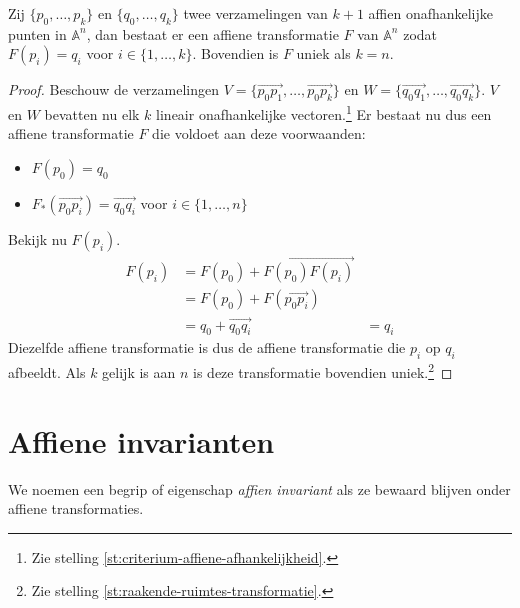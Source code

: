 \documentclass[main.tex]{subfiles}
\begin{document}
\begin{gev}
  Zij $\{p_{0},\dotsc,p_{k}\}$ en $\{q_{0},\dotsc,q_{k}\}$ twee verzamelingen van $k+1$ affien onafhankelijke punten in $\mathbb{A}^{n}$, dan bestaat er een affiene transformatie $F$ van $\mathbb{A}^{n}$ zodat $F(p_{i}) = q_{i}$ voor $i \in \{ 1,\dotsc,k \}$. Bovendien is $F$ uniek als $k=n$.

  \begin{proof}
    Beschouw de verzamelingen $V = \{\overrightarrow{p_{0}p_{1}},\dotsc,\overrightarrow{p_{0}p_{k}}\}$ en $W = \{\overrightarrow{q_{0}q_{1}},\dotsc,\overrightarrow{q_{0}q_{k}}\}$.
    $V$ en $W$ bevatten nu elk $k$ lineair onafhankelijke vectoren.\footnote{Zie stelling \ref{st:criterium-affiene-afhankelijkheid}.}
    Er bestaat nu dus een affiene transformatie $F$ die voldoet aan deze voorwaanden:
    \begin{itemize}
    \item $F(p_{0}) = q_{0}$
    \item $F_{*}(\overrightarrow{p_{0}p_{i}}) = \overrightarrow{q_{0}q_{i}}$ voor $i \in \{ 1,\dotsc,n \}$
    \end{itemize}
    Bekijk nu $F(p_{i})$.
    \[
    \begin{array}{rll}
      F(p_{i}) &= F(p_{0}) + \overrightarrow{F(p_{0})F(p_{i})} &\\
               &= F(p_{0}) + F(\overrightarrow{p_{0}p_{i}}) &\\
               &= q_{0} + \overrightarrow{q_{0}q_{i}} &= q_{i}
    \end{array} 
    \]
    Diezelfde affiene transformatie is dus de affiene transformatie die $p_{i}$ op $q_{i}$ afbeeldt.
    Als $k$ gelijk is aan $n$ is deze transformatie bovendien uniek.\footnote{Zie stelling \ref{st:raakende-ruimtes-transformatie}.}
   \end{proof}
\end{gev}


\section{Affiene invarianten}
\label{sec:affiene-invarianten}

\begin{de}
  We noemen een begrip of eigenschap \emph{affien invariant} als ze bewaard blijven onder affiene transformaties.
\end{de}
\end{document}
